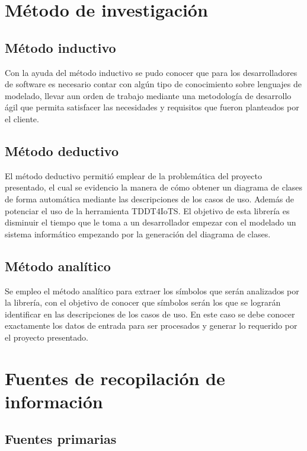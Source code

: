 \section{Método de investigación}

\subsection{Método inductivo}

Con la ayuda del método inductivo se pudo conocer que para los desarrolladores de software es necesario contar con algún tipo de conocimiento sobre lenguajes de modelado, llevar aun orden de trabajo mediante una metodología de desarrollo ágil que permita satisfacer las necesidades y requisitos que fueron planteados por el cliente.

\subsection{Método deductivo}

El método deductivo permitió emplear de la problemática del proyecto presentado, el cual se evidencio la manera de cómo obtener un diagrama de clases de forma automática mediante las descripciones de los casos de uso. Además de potenciar el uso de la herramienta TDDT4IoTS. El objetivo de esta librería es disminuir el tiempo que le toma a un desarrollador empezar con el modelado un sistema informático empezando por la generación del diagrama de clases.

\subsection{Método analítico}

Se empleo el método analítico para extraer los símbolos que serán analizados por la librería, con el objetivo de conocer que símbolos serán los que se lograrán identificar en las descripciones de los casos de uso. En este caso se debe conocer exactamente los datos de entrada para ser procesados y generar lo requerido por el proyecto presentado.

\section{Fuentes de recopilación de información}

\subsection{Fuentes primarias}

